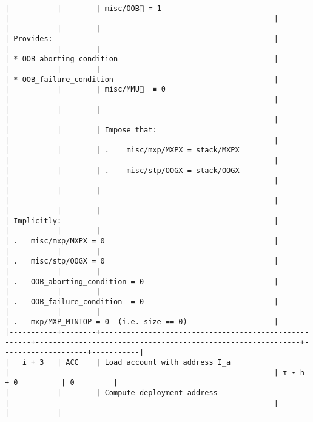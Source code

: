 \documentclass[varwidth=\maxdimen,margin=0.5cm,multi={verbatim}]{standalone}
\begin{document}
\begin{verbatim}
|           |        | misc/OOB🚩 ≡ 1                                       |                                                             |
|           |        |                                                      | Provides:                                                   |
|           |        |                                                      | * OOB_aborting_condition                                    |
|           |        |                                                      | * OOB_failure_condition                                     |
|           |        | misc/MMU🚩  ≡ 0                                      |                                                             |
|           |        |                                                      |                                                             |
|           |        | Impose that:                                         |                                                             |
|           |        | .    misc/mxp/MXPX = stack/MXPX                      |                                                             |
|           |        | .    misc/stp/OOGX = stack/OOGX                      |                                                             |
|           |        |                                                      |                                                             |
|           |        |                                                      | Implicitly:                                                 |
|           |        |                                                      | .   misc/mxp/MXPX = 0                                       |
|           |        |                                                      | .   misc/stp/OOGX = 0                                       |
|           |        |                                                      | .   OOB_aborting_condition = 0                              |
|           |        |                                                      | .   OOB_failure_condition  = 0                              |
|           |        |                                                      | .   mxp/MXP_MTNTOP = 0  (i.e. size == 0)                    |
|-----------+--------+------------------------------------------------------+-------------------------------------------------------------+--------------------+-----------|
|   i + 3   | ACC    | Load account with address I_a                        |                                                             | τ ∙ h + 0          | 0         |
|           |        | Compute deployment address                           |                                                             |                    |           |

\end{verbatim}
\end{document}
